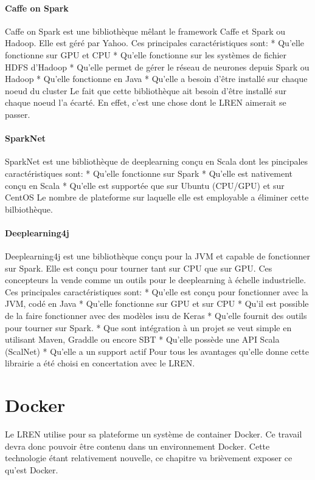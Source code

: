 \documentclass[a4paper,10pt,openany,oneside]{sphinxmanual}
\begin{document}
\paragraph{Caffe on Spark}
\label{index:caffe-on-spark}
Caffe on Spark est une bibliothèque mêlant le framework Caffe et Spark ou Hadoop. Elle est géré par Yahoo. Ces principales caractéristiques sont:
* Qu'elle fonctionne sur GPU et CPU
* Qu'elle fonctionne sur les systèmes de fichier HDFS d'Hadoop
* Qu'elle permet de gérer le réseau de neurones depuis Spark ou Hadoop
* Qu'elle fonctionne en Java
* Qu'elle a besoin d'être installé sur chaque noeud du cluster
Le fait que cette bibliothèque ait besoin d'être installé sur chaque noeud l'a écarté. En effet, c'est une chose dont le LREN aimerait se passer.


\paragraph{SparkNet}
\label{index:sparknet}
SparkNet est une bibliothèque de deeplearning conçu en Scala dont les pincipales caractéristiques sont:
* Qu'elle fonctionne sur Spark
* Qu'elle est nativement conçu en Scala
* Qu'elle est supportée que sur Ubuntu (CPU/GPU) et sur CentOS
Le nombre de plateforme sur laquelle elle est employable a éliminer cette bilbiothèque.


\paragraph{Deeplearning4j}
\label{index:deeplearning4j}
Deeplearning4j est une bibliothèque conçu pour la JVM et capable de fonctionner sur Spark. Elle est conçu pour tourner tant sur CPU que sur GPU.
Ces concepteurs la vende comme un outils pour le deeplearning à échelle industrielle. Ces principales caractéristiques sont:
* Qu'elle est conçu pour fonctionner avec la JVM, codé en Java
* Qu'elle fonctionne sur GPU et sur CPU
* Qu'il est possible de la faire fonctionner avec des modèles issu de Keras
* Qu'elle fournit des outils pour tourner sur Spark.
* Que sont intégration à un projet se veut simple en utilisant Maven, Graddle ou encore SBT
* Qu'elle possède une API Scala (ScalNet)
* Qu'elle a un support actif
Pour tous les avantages qu'elle donne cette librairie a été choisi en concertation avec le LREN.


\section{Docker}
\label{index:docker}
Le LREN utilise pour sa plateforme un système de container Docker. Ce travail devra donc pouvoir être contenu dans un
environnement Docker. Cette technologie étant relativement nouvelle, ce chapitre va brièvement exposer ce qu'est Docker.
\end{document}
